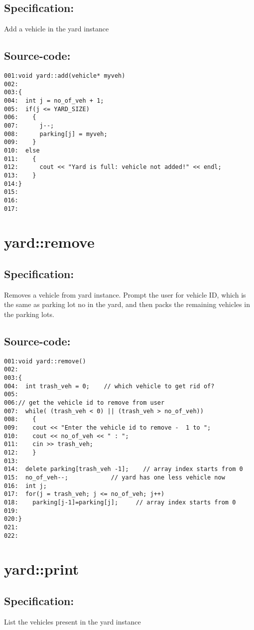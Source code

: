 \subsection*{Specification:}
Add a vehicle in the yard instance
\subsection*{Source-code:}
\begin{verbatim}
001:void yard::add(vehicle* myveh)
002:
003:{
004:  int j = no_of_veh + 1;
005:  if(j <= YARD_SIZE)
006:    {
007:      j--;
008:      parking[j] = myveh;
009:    }
010:  else
011:    {
012:      cout << "Yard is full: vehicle not added!" << endl;
013:    }
014:}
015:
016:
017:
\end{verbatim}
\section{yard::remove}
\subsection*{Specification:}
Removes a vehicle from yard instance. Prompt the user for
  vehicle ID, which is the same as parking lot no in the
  yard, and then packs the remaining vehicles in the parking
  lots.
\subsection*{Source-code:}
\begin{verbatim}
001:void yard::remove()
002:
003:{
004:  int trash_veh = 0;    // which vehicle to get rid of?
005:
006:// get the vehicle id to remove from user
007:  while( (trash_veh < 0) || (trash_veh > no_of_veh))
008:    {
009:    cout << "Enter the vehicle id to remove -  1 to ";
010:    cout << no_of_veh << " : ";
011:    cin >> trash_veh;
012:    }
013:
014:  delete parking[trash_veh -1];    // array index starts from 0
015:  no_of_veh--;            // yard has one less vehicle now
016:  int j;
017:  for(j = trash_veh; j <= no_of_veh; j++)
018:    parking[j-1]=parking[j];     // array index starts from 0
019:
020:}
021:
022:
\end{verbatim}
\section{yard::print}
\subsection*{Specification:}
List the vehicles present in the yard instance
